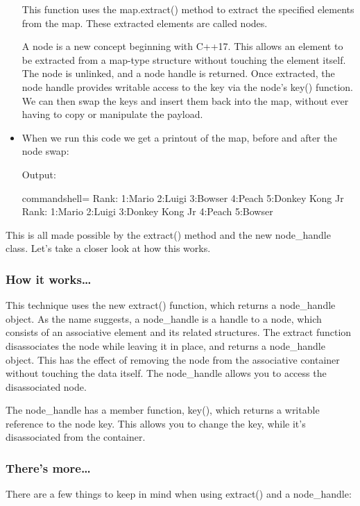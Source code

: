 \begin{itemize}
This function uses the map.extract() method to extract the specified elements from the map. These extracted elements are called nodes.

A node is a new concept beginning with C++17. This allows an element to be extracted from a map-type structure without touching the element itself. The node is unlinked, and a node handle is returned. Once extracted, the node handle provides writable access to the key via the node's key() function. We can then swap the keys and insert them back into the map, without ever having to copy or manipulate the payload.

\item 
When we run this code we get a printout of the map, before and after the node swap: 

Output:

\begin{tcblisting}{commandshell={}}
Rank:
1:Mario
2:Luigi
3:Bowser
4:Peach
5:Donkey Kong Jr
Rank:
1:Mario
2:Luigi
3:Donkey Kong Jr
4:Peach
5:Bowser
\end{tcblisting}
\end{itemize}

This is all made possible by the extract() method and the new node\_handle class.
Let's take a closer look at how this works.

\subsubsection{How it works…}

This technique uses the new extract() function, which returns a node\_handle object. As the name suggests, a node\_handle is a handle to a node, which consists of an associative element and its related structures. The extract function disassociates the node while leaving it in place, and returns a node\_handle object. This has the effect of removing the node from the associative container without touching the data itself. The node\_handle allows you to access the disassociated node.

The node\_handle has a member function, key(), which returns a writable reference to the node key. This allows you to change the key, while it's disassociated from the container.

\subsubsection{There's more…}

There are a few things to keep in mind when using extract() and a node\_handle:

